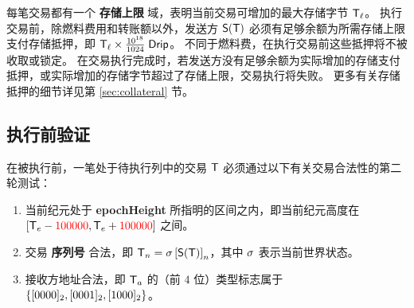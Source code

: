 每笔交易都有一个 \textbf{存储上限} 域，表明当前交易可增加的最大存储字节 $\textsf{T}_\ell$。
执行交易前，除燃料费用和转账额以外，发送方 $\mathsf{S}{\left({\textsf{T}} \right)}$ 必须有足够余额为所需存储上限支付存储抵押，即 $\textsf{T}_\ell\times\frac{10^{18}}{1024}\;{\sf Drip}$。
不同于燃料费，在执行交易前这些抵押将不被收取或锁定。
在交易执行完成时，若发送方没有足够余额为实际增加的存储支付抵押，或实际增加的存储字节超过了存储上限，交易执行将失败。
更多有关存储抵押的细节详见第 \ref{sec:collateral} 节。

\subsection{执行前验证}
\label{sec:tx validate}

在被执行前，一笔处于待执行列中的交易 $\textsf{T}$ 必须通过以下有关交易合法性的第二轮测试：
\begin{enumerate}[nosep]
	\item 当前纪元处于 \textbf{epochHeight} 所指明的区间之内，即当前纪元高度在 $[\textsf{T}_e - {\color{red}100000}, \textsf{T}_e + {\color{red}100000}]$ 之间。
	
	\item 交易 \textbf{序列号} 合法，即 $\textsf{T}_n = \mathbf{\sigma}\left[\mathsf{S}{\left({\textsf{T}} \right)}\right]_n$，其中 $\mathbf{\sigma}$ 表示当前世界状态。

	\item 接收方地址合法，即 $\textsf{T}_a$ 的（前 $4$ 位）类型标志属于 ${\left \{{[0000]_2,[0001]_2,[1000]_2} \right \}}$。
\end{enumerate}

